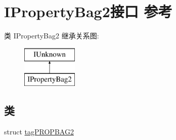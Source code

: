 \hypertarget{interface_i_property_bag2}{}\section{I\+Property\+Bag2接口 参考}
\label{interface_i_property_bag2}
类 I\+Property\+Bag2 继承关系图\+:\begin{figure}[H]
\begin{center}
\leavevmode
\includegraphics[height=2.000000cm]{interface_i_property_bag2}
\end{center}
\end{figure}
\subsection*{类}
\begin{DoxyCompactItemize}
\item 
struct \hyperlink{struct_i_property_bag2_1_1tag_p_r_o_p_b_a_g2}{tag\+P\+R\+O\+P\+B\+A\+G2}
\end{DoxyCompactItemize}
